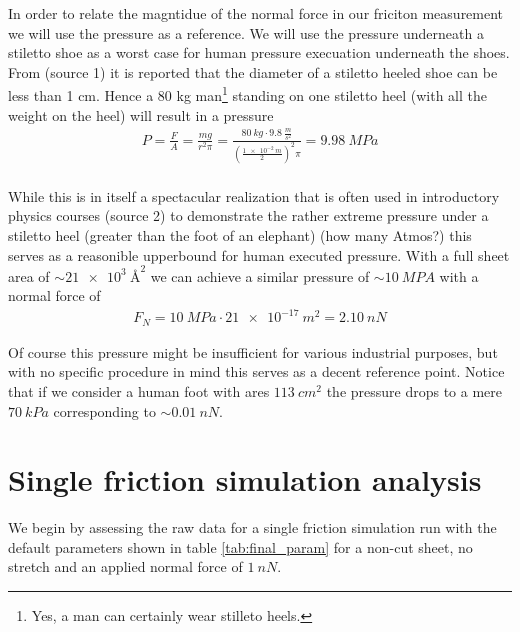 In order to relate the magntidue of the normal force in our friciton measurement
we will use the pressure as a reference. We will use the pressure underneath a
stiletto shoe as a worst case for human pressure execuation underneath the
shoes. From (source 1) it is reported that the diameter of a stiletto heeled
shoe can be less than 1 cm. Hence a 80 kg man\footnote{Yes, a man can certainly
wear stilleto heels.} standing on one stiletto heel (with all the weight on the
heel) will result in a pressure
\begin{align*}
  P = \frac{F}{A} = \frac{mg}{r^2\pi} = \frac{\SI{80}{kg} \cdot \SI{9.8}{\frac{m}{s^2}}}{(\frac{\SI{1e-2}{m}}{2})^2 \pi} = \SI{9.98}{MPa} \\
\end{align*} 

While this is in itself a spectacular realization that is often used in
introductory physics courses (source 2) to demonstrate the rather extreme
pressure under a stiletto heel (greater than the foot of an elephant) (how many
Atmos?) this serves as a reasonible upperbound for human executed pressure. With
a full sheet area of $\sim\SI{21e3}{{\text{Å}}^2}$ we can achieve a similar pressure of
$\sim \SI{10}{MPA}$ with a normal force of
\begin{align*}
  F_N = \SI{10}{MPa} \cdot \SI{21e-17}{m^2} = \SI{2.10}{nN}  
\end{align*}

Of course this pressure might be insufficient for various industrial purposes,
but with no specific procedure in mind this serves as a decent reference point.
Notice that if we consider a human foot with ares $\SI{113}{cm^2}$ the pressure
drops to a mere $\SI{70}{kPa}$ corresponding to $\sim \SI{0.01}{nN}$.





\newpage
\section{Single friction simulation analysis}\label{sec:single_analysis}
We begin by assessing the raw data for a single friction simulation run with the default parameters shown in table \ref{tab:final_param} for a non-cut sheet, no stretch and an applied normal force of $\SI{1}{nN}$.


